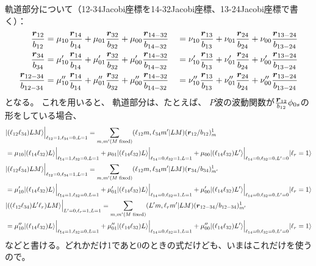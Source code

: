 \documentclass[a4j]{jarticle}
\def\ket{\rangle}
\newcommand{\xbld}[1]{\mbox{\boldmath $#1$}}
\def\vecr{{\xbld{r}}}
\begin{document}
軌道部分について（12-34Jacobi座標を14-32Jacobi座標、13-24Jacobi座標で書く）：
\begin{align}
{\vecr_{12}\over b_{12}}&=\mu_{10}{\vecr_{14}\over b_{14}}+\mu_{01}{\vecr_{32}\over b_{32}}+\mu_{00}{\vecr_{14-32}\over b_{14-32}}
&&=\nu_{10}{\vecr_{13}\over b_{13}}+\nu_{01}{\vecr_{24}\over b_{24}}+\nu_{00}{\vecr_{13-24}\over b_{13-24}}
\\
{\vecr_{34}\over b_{34}}&=\mu_{10}'{\vecr_{14}\over b_{14}}+\mu_{01}'{\vecr_{32}\over b_{32}}+\mu_{00}'{\vecr_{14-32}\over b_{14-32}}
&&=\nu_{10}'{\vecr_{13}\over b_{13}}+\nu_{01}'{\vecr_{24}\over b_{24}}+\nu_{00}'{\vecr_{13-24}\over b_{13-24}}
\\
{\vecr_{12-34}\over b_{12-34}}&=\mu_{10}''{\vecr_{14}\over b_{14}}+\mu_{01}''{\vecr_{32}\over b_{32}}+\mu_{00}''{\vecr_{14-32}\over b_{14-32}}
&&=\nu_{10}''{\vecr_{13}\over b_{13}}+\nu_{01}''{\vecr_{24}\over b_{24}}+\nu_{00}''{\vecr_{13-24}\over b_{13-24}}
\end{align}
となる。
これを用いると、
軌道部分は、たとえば、
$P$波の波動関数が${\vecr_{12}\over b_{12}}\phi_{0s}$の形をしている場合、
\begin{align}
&|(\ell_{12}\ell_{34})LM\ket\Big|_{\ell_{12}=1,\ell_{34}=0,L=1} 
= \sum_{m,m' (M\text{ fixed})}(\ell_{12}m,\ell_{34}m'|LM)(\vecr_{12}/b_{12}){}^1_m\\
&=
 \mu_{10} |(\ell_{14}\ell_{32})L\ket\Big|_{\ell_{14}=1,\ell_{32}=0,L=1} 
+\mu_{01} |(\ell_{14}\ell_{32})L\ket\Big|_{\ell_{14}=0,\ell_{32}=1,L=1} 
+\mu_{00}|(\ell_{14}\ell_{32})L'\ket \Big|_{\ell_{14}=0,\ell_{32}=0,L'=0} |\ell_r=1\ket
\\
&|(\ell_{12}\ell_{34})LM\ket\Big|_{\ell_{12}=0,\ell_{34}=1,L=1} 
= \sum_{m,m' (M\text{ fixed})}(\ell_{12}m,\ell_{34}m'|LM)(\vecr_{34}/b_{34}){}^1_{m'}\\
&=
 \mu'_{10} |(\ell_{14}\ell_{32})L\ket\Big|_{\ell_{14}=1,\ell_{32}=0,L=1} 
+\mu'_{01} |(\ell_{14}\ell_{32})L\ket\Big|_{\ell_{14}=0,\ell_{32}=1,L=1} 
+\mu'_{00}|(\ell_{14}\ell_{32})L'\ket \Big|_{\ell_{14}=0,\ell_{32}=0,L'=0} |\ell_r=1\ket
\\
&|((\ell_{12}\ell_{34})L'\ell_r)LM\ket\Big|_{L'=0,\ell_r=1,L=1} 
= \sum_{m,m' (M\text{ fixed})}(L'm,\ell_rm'|LM)(\vecr_{12-34}/b_{12-34}){}^1_{m'}\\
&=
 \mu''_{10} |(\ell_{14}\ell_{32})L\ket\Big|_{\ell_{14}=1,\ell_{32}=0,L=1} 
+\mu''_{01} |(\ell_{14}\ell_{32})L\ket\Big|_{\ell_{14}=0,\ell_{32}=1,L=1} 
+\mu''_{00}|(\ell_{14}\ell_{32})L'\ket \Big|_{\ell_{14}=0,\ell_{32}=0,L'=0} |\ell_r=1\ket
\end{align}
などと書ける。どれかだけ1であと0のときの式だけども、いまはこれだけを使うので。
\end{document}

